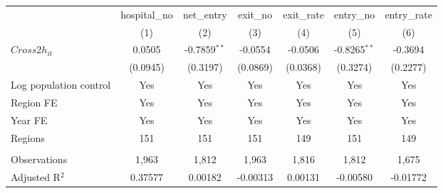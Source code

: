 \begingroup
\centering
\begin{tabular}{lcccccc}
   \toprule
                          & hospital\_no  & net\_entry     & exit\_no  & exit\_rate  & entry\_no      & entry\_rate \\    
                          & (1)           & (2)            & (3)       & (4)         & (5)            & (6)\\  
   \midrule 
   $Cross2h_{it}$         & 0.0505        & -0.7859$^{**}$ & -0.0554   & -0.0506     & -0.8265$^{**}$ & -0.3694\\   
                          & (0.0945)      & (0.3197)       & (0.0869)  & (0.0368)    & (0.3274)       & (0.2277)\\   
   Log population control & Yes           & Yes            & Yes       & Yes         & Yes            & Yes\\  
   Region FE              & Yes           & Yes            & Yes       & Yes         & Yes            & Yes\\  
   Year FE                & Yes           & Yes            & Yes       & Yes         & Yes            & Yes\\  
   Regions                & 151           & 151            & 151       & 149         & 151            & 149\\  
    \\
   Observations           & 1,963         & 1,812          & 1,963     & 1,816       & 1,812          & 1,675\\  
   Adjusted R$^2$         & 0.37577       & 0.00182        & -0.00313  & 0.00131     & -0.00580       & -0.01772\\  
   \bottomrule
\end{tabular}
\par\endgroup

